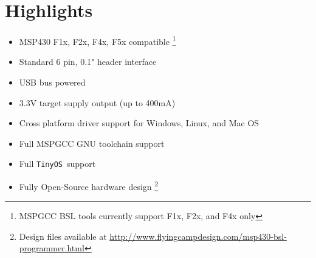 \documentclass[10pt,letterpaper]{datasheet}
\newcommand{\mbp}{MSP430~BSL~Programmer}
\newcommand{\PID}{FCD-PRG01}
\newcommand{\FCD}{FLYING~CAMP~DESIGN}
\newcommand{\tos}{\texttt{TinyOS}}
\begin{document}
\title{\color{red}{\bf \mbp\newline\PID}}
\author{\FCD}
\date{}
\maketitle
\makefooter
\thispagestyle{fancy}

\section*{Highlights}
\begin{multicols}{2}
  \begin{itemize}
    \item MSP430 F1x, F2x, F4x, F5x compatible%
    \footnote{MSPGCC BSL tools currently support F1x, F2x, and F4x only}
    \item Standard 6 pin, 0.1" header interface
    \item USB bus powered
    \item 3.3V target supply output (up to 400mA)
    \item Cross platform driver support for Windows, Linux, and Mac OS
    \item Full MSPGCC GNU toolchain support
    \item Full \tos\ support
    \item Fully Open-Source hardware design%
    \footnote{Design files available at %
    \href{http://www.flyingcampdesign.com/msp430-bsl-programmer.html}%
         {http://www.flyingcampdesign.com/msp430-bsl-programmer.html}}
  \end{itemize}
\end{multicols}
\end{document}
